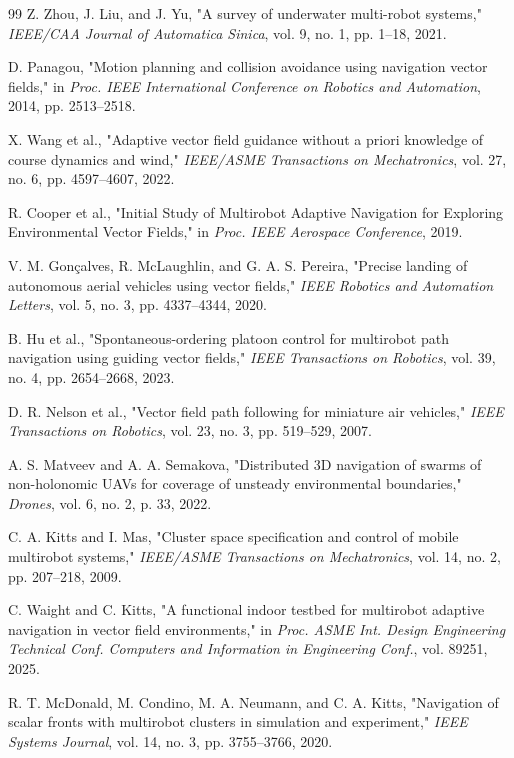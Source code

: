 \documentclass[lettersize,journal]{IEEEtran}
\begin{document}
\begin{thebibliography}{99}
 Z. Zhou, J. Liu, and J. Yu, "A survey of underwater multi-robot systems," \textit{IEEE/CAA Journal of Automatica Sinica}, vol. 9, no. 1, pp. 1--18, 2021.

 D. Panagou, "Motion planning and collision avoidance using navigation vector fields," in \textit{Proc. IEEE International Conference on Robotics and Automation}, 2014, pp. 2513--2518.

 X. Wang et al., "Adaptive vector field guidance without a priori knowledge of course dynamics and wind," \textit{IEEE/ASME Transactions on Mechatronics}, vol. 27, no. 6, pp. 4597--4607, 2022.

 R. Cooper et al., "Initial Study of Multirobot Adaptive Navigation for Exploring Environmental Vector Fields," in \textit{Proc. IEEE Aerospace Conference}, 2019.

 V. M. Gonçalves, R. McLaughlin, and G. A. S. Pereira, "Precise landing of autonomous aerial vehicles using vector fields," \textit{IEEE Robotics and Automation Letters}, vol. 5, no. 3, pp. 4337--4344, 2020.

 B. Hu et al., "Spontaneous-ordering platoon control for multirobot path navigation using guiding vector fields," \textit{IEEE Transactions on Robotics}, vol. 39, no. 4, pp. 2654--2668, 2023.

 D. R. Nelson et al., "Vector field path following for miniature air vehicles," \textit{IEEE Transactions on Robotics}, vol. 23, no. 3, pp. 519--529, 2007.

 A. S. Matveev and A. A. Semakova, "Distributed 3D navigation of swarms of non-holonomic UAVs for coverage of unsteady environmental boundaries," \textit{Drones}, vol. 6, no. 2, p. 33, 2022.

 C. A. Kitts and I. Mas, "Cluster space specification and control of mobile multirobot systems," \textit{IEEE/ASME Transactions on Mechatronics}, vol. 14, no. 2, pp. 207--218, 2009.

 C. Waight and C. Kitts, "A functional indoor testbed for multirobot adaptive navigation in vector field environments," in \textit{Proc. ASME Int. Design Engineering Technical Conf. Computers and Information in Engineering Conf.}, vol. 89251, 2025.

 R. T. McDonald, M. Condino, M. A. Neumann, and C. A. Kitts, "Navigation of scalar fronts with multirobot clusters in simulation and experiment," \textit{IEEE Systems Journal}, vol. 14, no. 3, pp. 3755--3766, 2020.


\end{thebibliography}
\end{document}

